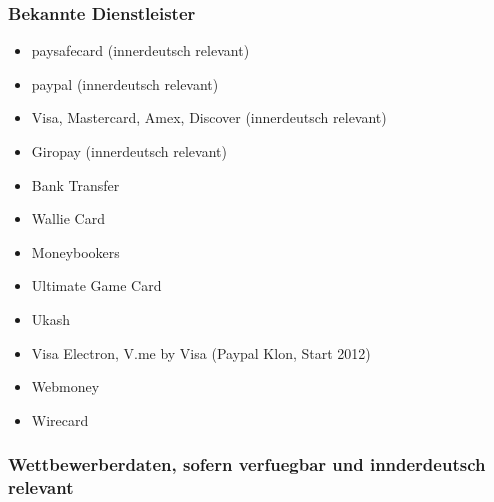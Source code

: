 
\subsubsection{Bekannte Dienstleister}

\begin{itemize}
 \item paysafecard (innerdeutsch relevant)
 \item paypal   (innerdeutsch relevant)
 \item Visa, Mastercard, Amex, Discover (innerdeutsch relevant)
 \item Giropay (innerdeutsch relevant)
 \item Bank Transfer
 \item Wallie Card
 \item Moneybookers
 \item Ultimate Game Card
 \item Ukash
 \item Visa Electron, V.me by Visa (Paypal Klon, Start 2012)
 \item Webmoney
 \item Wirecard
\end{itemize}
 


\subsubsection{Wettbewerberdaten, sofern verfuegbar und innderdeutsch relevant}

